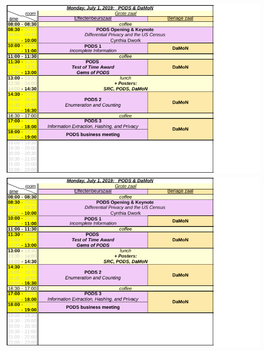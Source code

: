 \ifodd\value{page}
\includegraphics[angle=270,width=\textwidth]{schedule/p2.pdf}%
\else
\includegraphics[angle=90,width=\textwidth]{schedule/p2.pdf}%
\fi

\newpage

